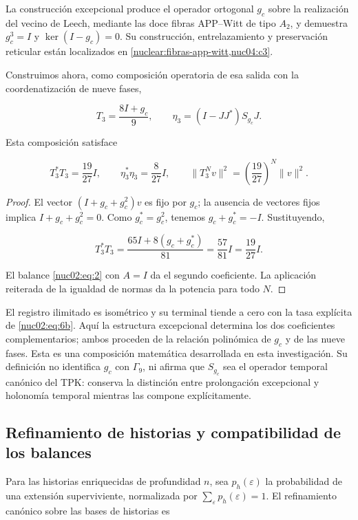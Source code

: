 La construcción excepcional produce el operador ortogonal \(g_c\) sobre la realización del vecino de Leech, mediante las doce fibras APP–Witt de tipo \(A_2\), y demuestra \(g_c^3=I\) y \(\ker(I-g_c)=0\). Su construcción, entrelazamiento y preservación reticular están localizados en \cref{nuclear:fibras-app-witt,nuc04:c3}.

Construimos ahora, como composición operatoria de esa salida con la coordenatización de nueve fases,

\[
T_3=\frac{8I+g_c}{9},\qquad
\eta_3=(I-JJ^*)S_{g_c}J.
\]

\begin{corollary}
Esta composición satisface

\begin{equation}
\boxed{T_3^*T_3=\frac{19}{27}I,\qquad
\eta_3^*\eta_3=\frac8{27}I,\qquad
\|T_3^Nv\|^2=\left(\frac{19}{27}\right)^N\|v\|^2.}\label{nuc02:eq:6b}
\end{equation}
\end{corollary}

\begin{proof}
El vector \((I+g_c+g_c^2)v\) es fijo por \(g_c\); la ausencia de vectores fijos implica \(I+g_c+g_c^2=0\). Como \(g_c^*=g_c^2\), tenemos \(g_c+g_c^*=-I\). Sustituyendo,

\[
T_3^*T_3=\frac{65I+8(g_c+g_c^*)}{81}
=\frac{57}{81}I=\frac{19}{27}I.
\]

El balance \eqref{nuc02:eq:2} con \(A=I\) da el segundo coeficiente. La aplicación reiterada de la igualdad de normas da la potencia para todo \(N\).
\end{proof}

El registro ilimitado es isométrico y su terminal tiende a cero con la tasa explícita de \eqref{nuc02:eq:6b}. Aquí la estructura excepcional determina los dos coeficientes complementarios; ambos proceden de la relación polinómica de \(g_c\) y de las nueve fases. Esta es una composición matemática desarrollada en esta investigación. Su definición no identifica \(g_c\) con \(\Gamma_9\), ni afirma que \(S_{g_c}\) sea el operador temporal canónico del TPK: conserva la distinción entre prolongación excepcional y holonomía temporal mientras las compone explícitamente.

\subsection{Refinamiento de historias y compatibilidad de los balances}

Para las historias enriquecidas de profundidad \(n\), sea \(p_h(\varepsilon)\) la probabilidad de una extensión superviviente, normalizada por \(\sum_\varepsilon p_h(\varepsilon)=1\). El refinamiento canónico sobre las bases de historias es

